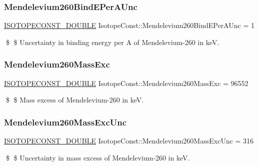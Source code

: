 \subsubsection{\texorpdfstring{Mendelevium260\+Bind\+E\+Per\+A\+Unc}{Mendelevium260BindEPerAUnc}}
{\footnotesize\ttfamily \mbox{\hyperlink{group___isotope_const-_macros_ga8f45a7272ce02c0b4c65c44636ed719a}{I\+S\+O\+T\+O\+P\+E\+C\+O\+N\+S\+T\+\_\+\+D\+O\+U\+B\+LE}} Isotope\+Const\+::\+Mendelevium260\+Bind\+E\+Per\+A\+Unc = 1}

\$ \$ Uncertainty in binding energy per A of Mendelevium-\/260 in keV. \mbox{\label{group___isotope_const-_mendelevium-_md260_gad6312118111da5c362c1c44b5e57ded6}} 
\subsubsection{\texorpdfstring{Mendelevium260\+Mass\+Exc}{Mendelevium260MassExc}}
{\footnotesize\ttfamily \mbox{\hyperlink{group___isotope_const-_macros_ga8f45a7272ce02c0b4c65c44636ed719a}{I\+S\+O\+T\+O\+P\+E\+C\+O\+N\+S\+T\+\_\+\+D\+O\+U\+B\+LE}} Isotope\+Const\+::\+Mendelevium260\+Mass\+Exc = 96552}

\$ \$ Mass excess of Mendelevium-\/260 in keV. \mbox{\label{group___isotope_const-_mendelevium-_md260_gaf2134bf4a36883cbd079f6b7f659680b}} 
\subsubsection{\texorpdfstring{Mendelevium260\+Mass\+Exc\+Unc}{Mendelevium260MassExcUnc}}
{\footnotesize\ttfamily \mbox{\hyperlink{group___isotope_const-_macros_ga8f45a7272ce02c0b4c65c44636ed719a}{I\+S\+O\+T\+O\+P\+E\+C\+O\+N\+S\+T\+\_\+\+D\+O\+U\+B\+LE}} Isotope\+Const\+::\+Mendelevium260\+Mass\+Exc\+Unc = 316}

\$ \$ Uncertainty in mass excess of Mendelevium-\/260 in keV. \mbox{\label{group___isotope_const-_mendelevium-_md260_gaeb854bd573fb82921b9ba4832f11d643}} 
